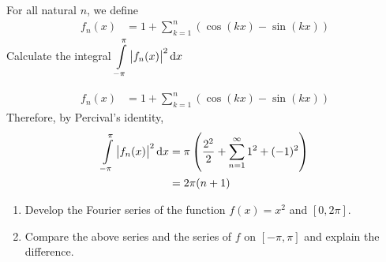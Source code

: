 \documentclass[fleqn, a4paper, 11pt, oneside]{amsart}
\theoremstyle{definition}
\theoremstyle{theorem}
\begin{document}
\begin{question}
	For all natural $n$, we define
	\begin{align*}
		f_n(x) &= 1 + \sum\limits_{k = 1}^{n} \left( \cos(k x) - \sin(k x) \right)
	\end{align*}
	Calculate the integral $\displaystyle \int\limits_{-\pi}^{\pi} \left| f_n(x) \right|^2 \dif x$
\end{question}

\begin{solution}
	\begin{align*}
		f_n(x) &= 1 + \sum\limits_{k = 1}^{n} \left( \cos(k x) - \sin(k x) \right)
	\end{align*}
	Therefore, by Percival's identity,
	\begin{align*}
		\int\limits_{-\pi}^{\pi} \left| f_n(x) \right|^2 \dif x &= \pi \left( \frac{2^2}{2} + \sum\limits_{n = 1}^{\infty} 1^2 + (-1)^2 \right)\\
		&= 2 \pi (n + 1)
	\end{align*}
\end{solution}

\begin{question}
	\begin{enumerate}
		\item Develop the Fourier series of the function $f(x) = x^2$ and $[0,2 \pi]$.
		\item Compare the above series and the series of $f$ on $[-\pi,\pi]$ and explain the difference.
	\end{enumerate}
\end{question}
\end{document}
